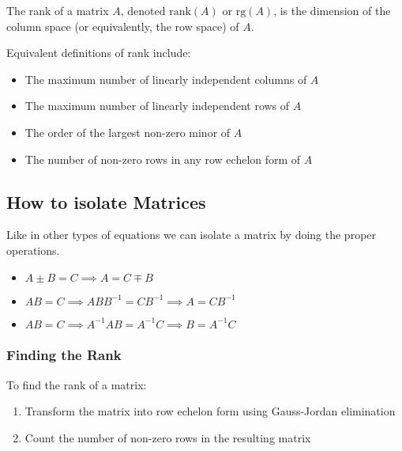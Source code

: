 The rank of a matrix \(A\), denoted \(\text{rank}(A)\) or \(\text{rg}(A)\), is the dimension of the column space (or equivalently, the row space) of \(A\).

Equivalent definitions of rank include:

\begin{itemize}
    
    \item The maximum number of linearly independent columns of \(A\)
    
    \item The maximum number of linearly independent rows of \(A\)
    
    \item The order of the largest non-zero minor of \(A\)
    
    \item The number of non-zero rows in any row echelon form of \(A\)

\end{itemize}

\subsection{How to isolate Matrices}

Like in other types of equations we can isolate a matrix by doing the proper operations.

\begin{itemize}

    \item \(A \pm B = C \implies A = C \mp B\) 

    \item \(AB = C \implies ABB^{-1} = CB^{-1}  \implies A = CB^{-1}\)

    \item \(AB = C \implies A^{-1}AB = A^{-1}C  \implies B = A^{-1}C\)

\end{itemize}


\subsubsection{Finding the Rank}

To find the rank of a matrix:
\begin{enumerate}

    \item Transform the matrix into row echelon form using Gauss-Jordan elimination

    \item Count the number of non-zero rows in the resulting matrix

\end{enumerate}

